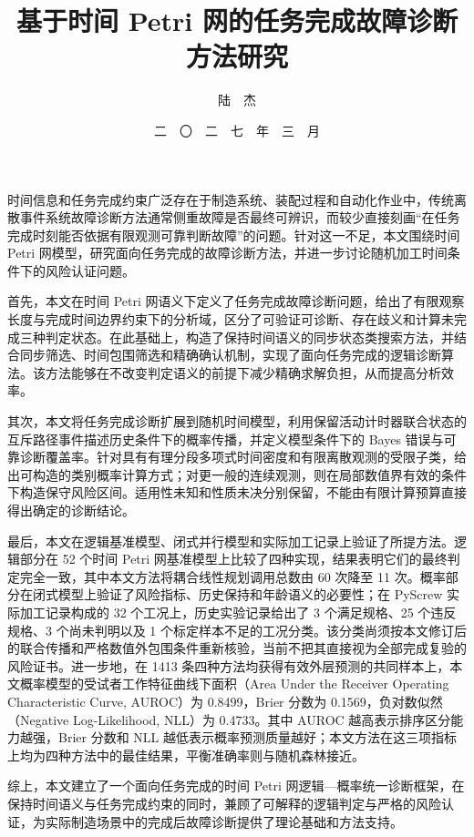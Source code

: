 \documentclass[master,fontset=ubuntu]{shnuthesis}
\title{基于时间 Petri 网的任务完成故障诊断方法研究}
\author{陆~~杰}   %
\date{二~~〇~~二~~七~~年~~三~~月 }  %
\institute{信~息~与~机~电~工~程~学~院}  %
\theoremstyle{definition}
\begin{document}
\maketitle

\makestatement


\frontmatter


\begin{cnabstract}
时间信息和任务完成约束广泛存在于制造系统、装配过程和自动化作业中，传统离散事件系统故障诊断方法通常侧重故障是否最终可辨识，而较少直接刻画“在任务完成时刻能否依据有限观测可靠判断故障”的问题。针对这一不足，本文围绕时间 Petri 网模型，研究面向任务完成的故障诊断方法，并进一步讨论随机加工时间条件下的风险认证问题。

首先，本文在时间 Petri 网语义下定义了任务完成故障诊断问题，给出了有限观察长度与完成时间边界约束下的分析域，区分了可验证可诊断、存在歧义和计算未完成三种判定状态。在此基础上，构造了保持时间语义的同步状态类搜索方法，并结合同步筛选、时间包围筛选和精确确认机制，实现了面向任务完成的逻辑诊断算法。该方法能够在不改变判定语义的前提下减少精确求解负担，从而提高分析效率。

其次，本文将任务完成诊断扩展到随机时间模型，利用保留活动计时器联合状态的互斥路径事件描述历史条件下的概率传播，并定义模型条件下的 Bayes 错误与可靠诊断覆盖率。针对具有有理分段多项式时间密度和有限离散观测的受限子类，给出可构造的类别概率计算方式；对更一般的连续观测，则在局部数值界有效的条件下构造保守风险区间。适用性未知和性质未决分别保留，不能由有限计算预算直接得出确定的诊断结论。

最后，本文在逻辑基准模型、闭式并行模型和实际加工记录上验证了所提方法。逻辑部分在 52 个时间 Petri 网基准模型上比较了四种实现，结果表明它们的最终判定完全一致，其中本文方法将耦合线性规划调用总数由 60 次降至 11 次。概率部分在闭式模型上验证了风险指标、历史保持和年龄语义的必要性；在 PyScrew 实际加工记录构成的 32 个工况上，历史实验记录给出了 3 个满足规格、25 个违反规格、3 个尚未判明以及 1 个标定样本不足的工况分类。该分类尚须按本文修订后的联合传播和严格数值外包围条件重新核验，当前不把其直接视为全部完成复验的风险证书。进一步地，在 1413 条四种方法均获得有效外层预测的共同样本上，本文概率模型的受试者工作特征曲线下面积（Area Under the Receiver Operating Characteristic Curve, AUROC）为 0.8499，Brier 分数为 0.1569，负对数似然（Negative Log-Likelihood, NLL）为 0.4733。其中 AUROC 越高表示排序区分能力越强，Brier 分数和 NLL 越低表示概率预测质量越好；本文方法在这三项指标上均为四种方法中的最佳结果，平衡准确率则与随机森林接近。

综上，本文建立了一个面向任务完成的时间 Petri 网逻辑—概率统一诊断框架，在保持时间语义与任务完成约束的同时，兼顾了可解释的逻辑判定与严格的风险认证，为实际制造场景中的完成后故障诊断提供了理论基础和方法支持。

\end{cnabstract}
\end{document}
